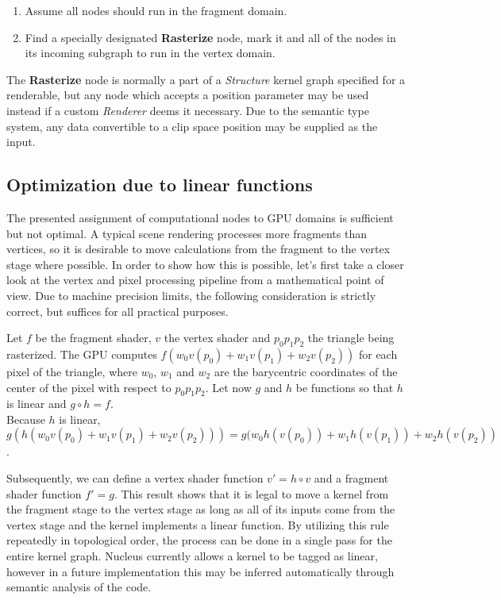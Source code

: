 \begin{enumerate}
\item Assume all nodes should run in the fragment domain.
\item Find a specially designated \textbf{Rasterize} node, mark it and all of the nodes in its incoming subgraph to run in the vertex domain.
\end{enumerate}

The \textbf{Rasterize} node is normally a part of a \emph{Structure} kernel graph specified for a renderable, but any node which accepts a position parameter may be used instead if a custom \emph{Renderer} deems it necessary. Due to the semantic type system, any data convertible to a clip space position may be supplied as the input.

\subsection{Optimization due to linear functions}

The presented assignment of computational nodes to GPU domains is sufficient but not optimal. A typical scene rendering processes more fragments than vertices, so it is desirable to move calculations from the fragment to the vertex stage where possible. In order to show how this is possible, let's first take a closer look at the vertex and pixel processing pipeline from a mathematical point of view. Due to machine precision limits, the following consideration is strictly correct, but suffices for all practical purposes.

Let $f$ be the fragment shader, $v$ the vertex shader and $p_0 p_1 p_2$ the triangle being rasterized. The GPU computes $f(w_0 v(p_0) + w_1 v(p_1) + w_2 v(p_2))$ for each pixel of the triangle, where $w_0$, $w_1$ and $w_2$ are the barycentric coordinates of the center of the pixel with respect to $p_0 p_1 p_2$. Let now $g$ and $h$ be functions so that $h$ is linear and $g \circ h = f$. \\
Because $h$ is linear, \\
$g(h(w_0 v(p_0) + w_1 v(p_1) + w_2 v(p_2))) = g(w_0 h(v(p_0)) + w_1 h(v(p_1)) + w_2 h(v(p_2))$.

Subsequently, we can define a vertex shader function $v\prime = h \circ v$ and a fragment shader function $f\prime = g$. This result shows that it is legal to move a kernel from the fragment stage to the vertex stage as long as all of its inputs come from the vertex stage and the kernel implements a linear function. By utilizing this rule repeatedly in topological order, the process can be done in a single pass for the entire kernel graph. Nucleus currently allows a kernel to be tagged as linear, however in a future implementation this may be inferred automatically through semantic analysis of the code.


